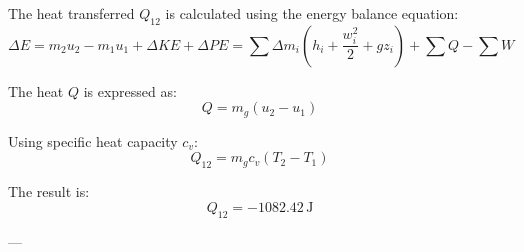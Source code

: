 The heat transferred \( Q_{12} \) is calculated using the energy balance equation:  
\[
\Delta E = m_2 u_2 - m_1 u_1 + \Delta KE + \Delta PE = \sum \Delta m_i \left( h_i + \frac{w_i^2}{2} + g z_i \right) + \sum Q - \sum W
\]  

The heat \( Q \) is expressed as:  
\[
Q = m_g (u_2 - u_1)
\]  

Using specific heat capacity \( c_v \):  
\[
Q_{12} = m_g c_v (T_2 - T_1)
\]  

The result is:  
\[
Q_{12} = -1082.42 \, \text{J}
\]  

---
